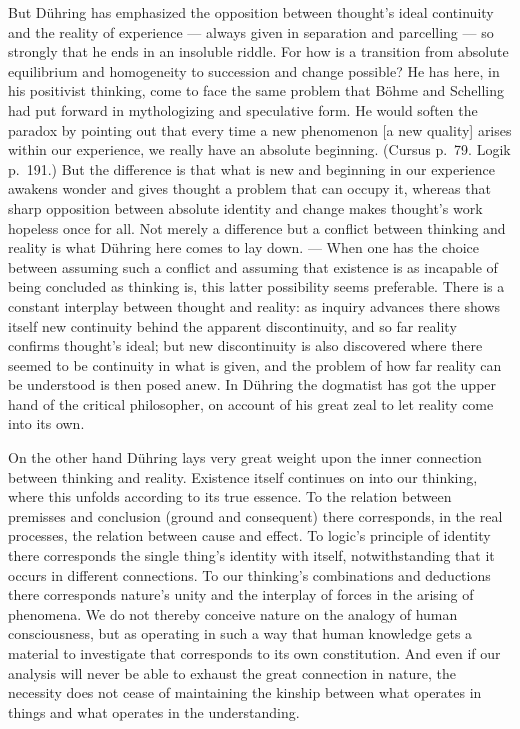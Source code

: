 \documentclass[12pt,a4paper]{book}
\newcommand{\opage}[1]{\marginnote{\footnotesize\textit{[#1]}}}
\begin{document}
But Dühring has emphasized the opposition between thought's ideal continuity and
the reality of experience --- always given in separation and parcelling --- so
strongly that he ends in an insoluble riddle. For how is a transition from
absolute equilibrium and homogeneity to succession and change possible? He has
here, in his positivist thinking, come to face the same problem that Böhme and
Schelling had put forward \opage{559}in mythologizing and speculative form. He would soften
the paradox by pointing out that every time a new phenomenon [a new quality]
arises within our experience, we really have an absolute beginning. (Cursus p.~79.
Logik p.~191.) But the difference is that what is new and beginning in our
experience awakens wonder and gives thought a problem that can occupy it, whereas
that sharp opposition between absolute identity and change makes thought's work
hopeless once for all. Not merely a difference but a conflict between thinking
and reality is what Dühring here comes to lay down. --- When one has the choice
between assuming such a conflict and assuming that existence is as incapable of
being concluded as thinking is, this latter possibility seems preferable. There
is a constant interplay between thought and reality: as inquiry advances there
shows itself new continuity behind the apparent discontinuity, and so far reality
confirms thought's ideal; but new discontinuity is also discovered where there
seemed to be continuity in what is given, and the problem of how far reality can
be understood is then posed anew. In Dühring the dogmatist has got the upper hand
of the critical philosopher, on account of his great zeal to let reality come
into its own.

On the other hand Dühring lays very great weight upon the inner connection
between thinking and reality. Existence itself continues on into our thinking,
where this unfolds according to its true essence. To the relation between
premisses and conclusion (ground and consequent) there corresponds, in the real
processes, the relation between cause and effect. To logic's principle of
identity there corresponds the single thing's identity with itself,
notwithstanding that it occurs in different connections. To our thinking's
combinations and deductions there corresponds nature's unity and the interplay of
forces in the arising of phenomena. We do not thereby conceive nature on the
analogy of human consciousness, but as operating in such a way that human
knowledge gets a material to investigate that corresponds to its own
constitution. And even if our analysis will never be able to exhaust the great
connection in nature, \opage{560}the necessity does not cease of maintaining the kinship
between what operates in things and what operates in the understanding.
\end{document}

